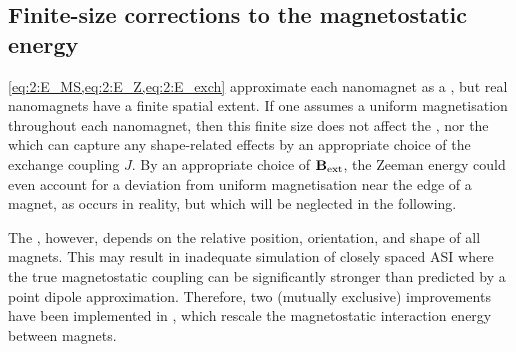 \subsection{Finite-size corrections to the magnetostatic energy}\label{sec:2:finite}
\cref{eq:2:E_MS,eq:2:E_Z,eq:2:E_exch} approximate each nanomagnet as a , but real nanomagnets have a finite spatial extent.
If one assumes a uniform magnetisation throughout each nanomagnet, then this finite size does not affect the , nor the  which can capture any shape-related effects by an appropriate choice of the exchange coupling $J$.
By an appropriate choice of $\boldsymbol{\mathbf{B}}_\mathrm{ext}$, the Zeeman energy could even account for a deviation from uniform magnetisation near the edge of a magnet, as occurs in reality, but which will be neglected in the following. \par
The , however, depends on the relative position, orientation, and shape of all magnets.
This may result in inadequate simulation of closely spaced ASI where the true magnetostatic coupling can be significantly stronger than predicted by a point dipole approximation.
Therefore, two (mutually exclusive) improvements have been implemented in \hotspice, which rescale the magnetostatic interaction energy between magnets.

